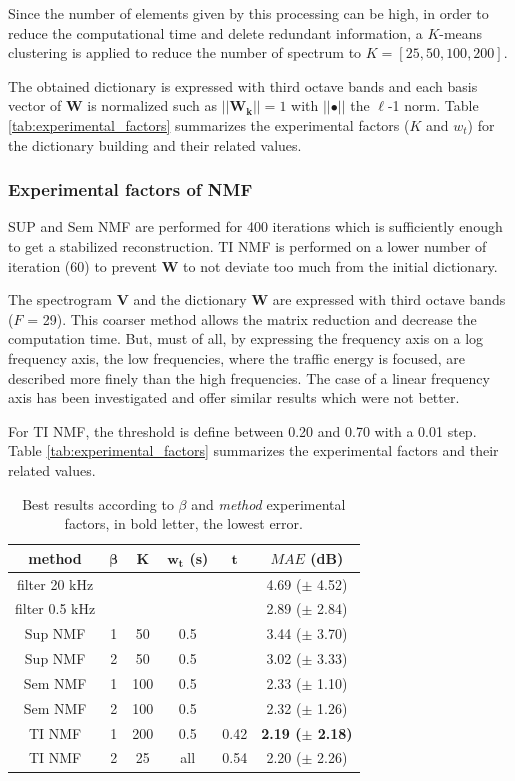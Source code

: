 \documentclass[twocolumn,a4paper,10pt]{article}
\begin{document}
Since the number of elements given by this processing can be high, in order to reduce the computational time and delete redundant information, a $K$-means clustering is applied to reduce the number of spectrum to $K = \left[ 25, 50, 100, 200\right]$.

The obtained dictionary is expressed with third octave bands and each basis vector of $\mathbf{W}$ is normalized such as $\vert \vert \mathbf{W_k} \vert \vert = 1$ with $\vert \vert \bullet \vert\vert$ the $\ell$-1 norm. Table \ref{tab:experimental_factors} summarizes the experimental factors ($K$ and $w_t$) for the dictionary building and their related values.

\subsubsection{Experimental factors of NMF}

SUP and Sem NMF are performed for 400 iterations which is sufficiently enough to get a stabilized reconstruction. TI NMF is performed on a lower number of iteration (60) to prevent $\mathbf{W}$ to not deviate too much from the initial dictionary.

The spectrogram $\mathbf{V}$ and the dictionary $\mathbf{W}$ are expressed with third octave bands ($F$ = 29). This coarser method allows the matrix reduction and decrease the computation time. But,  must of all, by expressing the frequency axis on a log frequency axis,  the low frequencies, where the traffic energy is focused, are described more finely than the high frequencies. The case of a linear frequency axis has been investigated and offer similar results which were not better.

For TI NMF, the threshold is define between 0.20 and 0.70 with a 0.01 step. Table \ref{tab:experimental_factors} summarizes the experimental factors and their related values.

\begin{table}[t]
\centering
\begin{tabular}{@{}cccccc@{}}
\toprule
\textbf{method} & $\mathbf{\beta}$ & $\mathbf{K}$ & $\mathbf{w_t}$ (s) &   $\mathbf{t}$ & \textbf{$MAE$ (dB)} \\ \midrule
filter 20 kHz &  &  &  &  & 4.69 ($\pm$ 4.52) \\
filter 0.5 kHz&  &   &  &  & 2.89 ($\pm$ 2.84) \\ \hline \hline
Sup NMF &  1 & 50 & 0.5  &  & 3.44 ($\pm$ 3.70) \\
Sup NMF &  2 & 50 & 0.5  &   & 3.02 ($\pm$ 3.33) \\ \hline \hline
Sem NMF &  1 & 100 & 0.5 &   & 2.33 ($\pm$ 1.10) \\
Sem NMF &  2 & 100 & 0.5 &   & 2.32 ($\pm$ 1.26) \\ \hline \hline
TI NMF &  1 & 200 & 0.5 &  0.42 &\textbf{2.19 ($\pm$ 2.18)} \\
TI NMF &  2 & 25 & all &  0.54 & 2.20 ($\pm$ 2.26)\\ \bottomrule
\end{tabular}
\caption{Best results according to $\beta$ and \textit{method} experimental factors, in bold letter, the lowest error.}
\label{tab:results}
\end{table}
\end{document}
